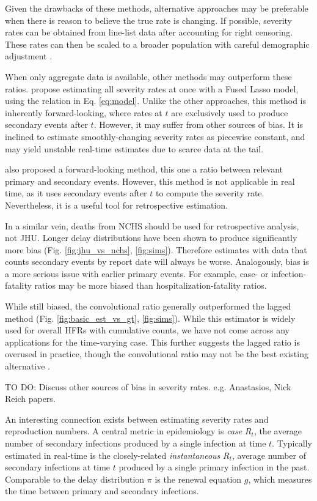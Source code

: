 \documentclass{article}
\begin{document}
Given the drawbacks of these methods, alternative approaches may be preferable when there is reason to believe the true rate is changing. If possible, severity rates can be obtained from line-list data after accounting for right censoring. These rates can then be scaled to a broader population with careful demographic adjustment \cite{verity2020estimates}. 

When only aggregate data is available, other methods may outperform these ratios. \citeauthor{fusedlasso} propose estimating all severity rates at once with a Fused Lasso model, using the relation in Eq. \ref{eq:model}. Unlike the other approaches, this method is inherently forward-looking, where rates at $t$ are exclusively used to produce secondary events after $t$. However, it may suffer from other sources of bias. It is inclined to estimate smoothly-changing severity rates as piecewise constant, and may yield unstable real-time estimates due to scarce data at the tail.

\citeauthor{UKpaper} also proposed a forward-looking method, this one a ratio between relevant primary and secondary events. However, this method is not applicable in real time, as it uses secondary events after $t$ to compute the severity rate. Nevertheless, it is a useful tool for retrospective estimation. 

In a similar vein, deaths from NCHS should be used for retrospective analysis, not JHU. Longer delay distributions have been shown to produce significantly more bias (Fig. \ref{fig:jhu_vs_nchs}, \ref{fig:sims}). Therefore estimates with data that counts secondary events by report date will always be worse. Analogously, bias is a more serious issue with earlier primary events. For example, case- or infection-fatality ratios may be more biased than hospitalization-fatality ratios. 

While still biased, the convolutional ratio generally outperformed the lagged method (Fig. \ref{fig:basic_est_vs_gt}, \ref{fig:sims}). While this estimator is widely used for overall HFRs with cumulative counts, we have not come across any applications for the time-varying case. This further suggests the lagged ratio is overused in practice, though the convolutional ratio may not be the best existing alternative \cite{fusedlasso, UKpaper}.

TO DO: Discuss other sources of bias in severity rates. e.g. Anastasios, Nick Reich papers.

An interesting connection exists between estimating severity rates and reproduction numbers. A central metric in epidemiology is \textit{case} $R_t$, the average number of secondary infections produced by a single infection at time $t$. Typically estimated in real-time is the closely-related \textit{instantaneous} $R_t$, average number of secondary infections at time $t$ produced by a single primary infection in the past. Comparable to the delay distribution $\pi$ is the renewal equation $g$, which measures the time between primary and secondary infections.
\end{document}
